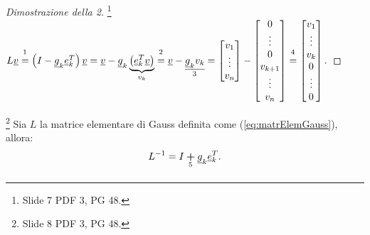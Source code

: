 \begin{proof}[Dimostrazione della 2]\footnote{Slide 7 PDF 3, PG 48.}
    $L\uline v\overset{\footnotemark}{=}\left(I-\uline g_k \uline e_k^T\right)\uline v= \uline v-\uline g_k\underbrace{\left(\uline e_k^T\uline v\right)}_{v_k} \overset{\footnotemark}{=}\uline v - \underset{\footnotemark}{\uline{\uline g_k v_k}}=\begin{bmatrix}
        v_1\\
        \vdots\\
        v_n
    \end{bmatrix}-
    \begin{bmatrix}
        0\\
        \vdots\\
        0\\
        v_{k+1}\\
        \vdots\\
        v_n
    \end{bmatrix}\overset{\footnotemark}{=}\begin{bmatrix}
        v_1\\
        \vdots\\
        v_k\\
        0\\
        \vdots\\
        0
    \end{bmatrix}.$
\end{proof}

\addtocounter{footnote}{-3}




\begin{theorem}\footnote{Slide 8 PDF 3, PG 48.}
    Sia $L$ la matrice elementare di Gauss definita come (\ref{eq:matrElemGauss}), allora:
    \begin{equation}
        L^{-1}=I\underset{\footnotemark}{\boldsymbol +}\uline g_k\uline e_k^T.
    \end{equation}
\end{theorem}

